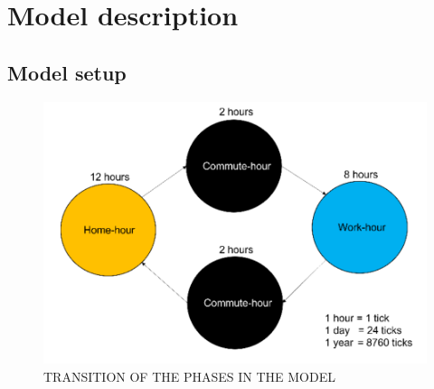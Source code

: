 \documentclass[smallextended]{svjour3}       %
\begin{document}
\section{Model description}


\subsection{Model setup}

\begin{figure}
	\centering
	\includegraphics[width=0.5\linewidth]{figures/ModelTransitions.png}
	\caption{TRANSITION OF THE PHASES IN THE MODEL}
\end{figure}
\end{document}
